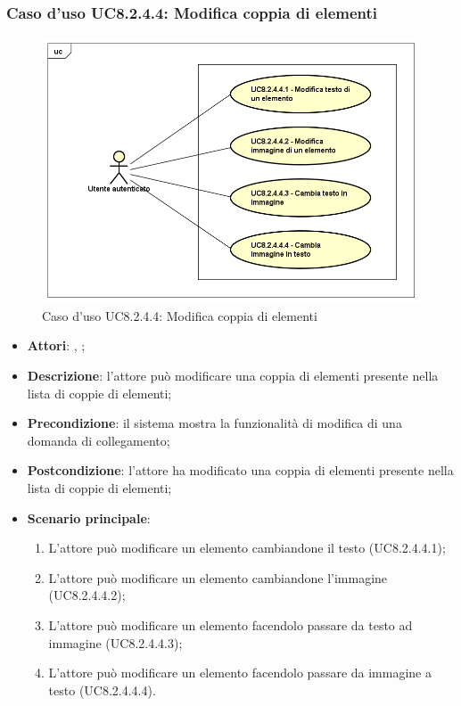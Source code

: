 	\subsubsection{Caso d'uso UC8.2.4.4: Modifica coppia di elementi}
	\label{UC8.2.4.4}
	\begin{figure}[h]
		\centering
		\includegraphics[scale=0.5,keepaspectratio]{UML/UC8_2_4_4.png}
		\caption{Caso d'uso UC8.2.4.4: Modifica coppia di elementi}
	\end{figure}
	\FloatBarrier
	\begin{itemize}
		\item \textbf{Attori}: \uau, \uaupro;
		\item \textbf{Descrizione}: l'attore può modificare una coppia di elementi presente nella lista di coppie di elementi;
		\item \textbf{Precondizione}: il sistema mostra la funzionalità di modifica di una domanda di collegamento; 
		\item \textbf{Postcondizione}: l'attore ha modificato una coppia di elementi presente nella lista di coppie di elementi; 
		\item \textbf{Scenario principale}: 
		\begin{enumerate}
			\item L'attore può modificare un elemento cambiandone il testo (UC8.2.4.4.1);
			\item L'attore può modificare un elemento cambiandone l'immagine (UC8.2.4.4.2);
			\item L'attore può modificare un elemento facendolo passare da testo ad immagine (UC8.2.4.4.3);
			\item L'attore può modificare un elemento facendolo passare da immagine a testo (UC8.2.4.4.4).	
		\end{enumerate}
	\end{itemize}
	
